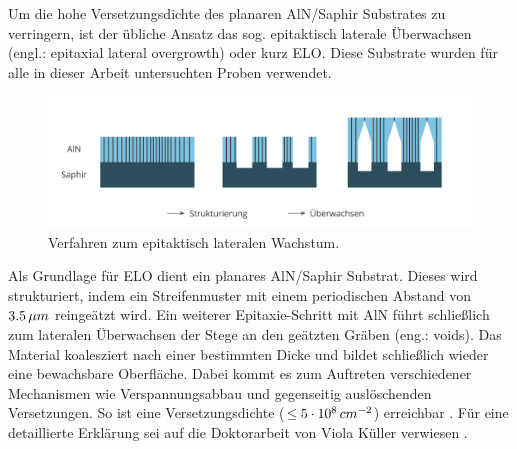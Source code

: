 Um die hohe Versetzungsdichte des planaren AlN/Saphir Substrates zu verringern, ist der übliche Ansatz das sog. epitaktisch laterale Überwachsen (engl.: epitaxial lateral overgrowth) oder kurz ELO. Diese Substrate wurden für alle in dieser Arbeit untersuchten Proben verwendet. 
\begin{figure}[h]
    \centering
    \begin{minipage}[t]{1\linewidth}
    \centering
    \includegraphics[width=1\linewidth]{Bilder/elostrukturierung.png}
    \end{minipage}%
    \caption{Verfahren zum epitaktisch lateralen Wachstum.}
     \label{fig:IQEthreadingdisl}
\end{figure}
\noindent
Als Grundlage für ELO dient ein planares AlN/Saphir Substrat. Dieses wird strukturiert, indem ein Streifenmuster mit einem periodischen Abstand von $3.5 \thinspace \mu m$ reingeätzt wird. Ein weiterer Epitaxie-Schritt mit AlN führt schließlich zum lateralen Überwachsen der Stege an den geätzten Gräben (eng.: voids).
Das Material koalesziert nach einer bestimmten Dicke und bildet schließlich wieder eine bewachsbare Oberfläche. Dabei kommt es zum Auftreten verschiedener Mechanismen wie Verspannungsabbau und gegenseitig auslöschenden Versetzungen. So ist eine Versetzungsdichte ($\leq 5 \cdot 10^8 \thinspace cm^{-2}$) erreichbar \cite{zeimeru} \cite{MOGILATENKO2014222} \cite{vkueller} \cite{IMURA2007257}. Für eine detaillierte Erklärung sei auf die Doktorarbeit von Viola Küller verwiesen \cite{vkueller}.